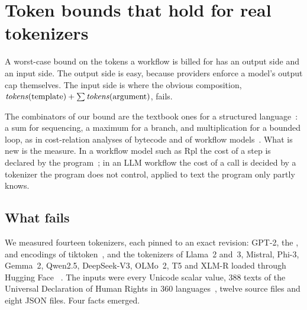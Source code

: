 \section{Token bounds that hold for real tokenizers}\label{sec:bounds}

A worst-case bound on the tokens a workflow is billed for has an output side and an
input side. The output side is easy, because providers enforce a model's output cap
themselves. The input side is where the obvious composition,
$\mathit{tokens}(\text{template}) + \sum \mathit{tokens}(\text{argument})$, fails.

The combinators of our bound are the textbook ones for a structured
language~\cite{Wegbreit1975}: a sum for sequencing, a maximum for a branch,
and multiplication for a bounded loop, as in cost-relation analyses of bytecode and
of workflow models~\cite{Albert2012CostBytecode,ali2023cost}. What is new is the measure. In
a workflow model such as Rpl the cost of a step is declared by the
program~\cite{ali2023cost}; in an LLM workflow the cost of a call is decided by a
tokenizer the program does not control, applied to text the program only partly
knows.

\subsection{What fails}\label{sec:what-fails}

We measured fourteen tokenizers, each pinned to an exact revision: GPT-2, the
,  and  encodings of
tiktoken~\cite{tiktoken}, and the tokenizers of Llama~2 and~3, Mistral, Phi-3,
Gemma~2, Qwen2.5, DeepSeek-V3, OLMo~2, T5 and XLM-R loaded through Hugging Face
~\cite{hftokenizers}. The inputs were every Unicode scalar value,
388 texts of the Universal Declaration of Human Rights in 360
languages~\cite{udhr2corpus}, twelve source files and eight JSON files. Four facts
emerged.

